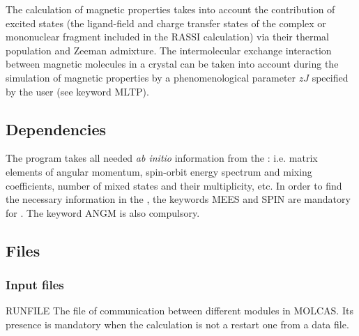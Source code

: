 
The calculation of magnetic properties takes into account the contribution of excited states (the ligand-field and charge transfer states of the complex or mononuclear fragment included in the RASSI calculation) via their thermal population and Zeeman admixture. The intermolecular exchange interaction between magnetic molecules in a crystal can be taken into account during the simulation of magnetic properties by a phenomenological parameter $zJ$ specified by the user (see keyword MLTP).

\subsection{Dependencies}
\label{UG:sec:single_aniso_dependencies}
The  program takes all needed {\it ab initio} information from the : i.e. matrix elements of angular momentum, spin-orbit energy spectrum and mixing coefficients, number of mixed states and their multiplicity, etc. In order to find the necessary information in the , the keywords MEES and SPIN are mandatory for . The  keyword ANGM is also compulsory.



\subsection{Files}
\label{UG:sec:single_aniso_files}

\subsubsection{Input files}
\begin{filelist}
\item[RUNFILE]
The file of communication between different modules in MOLCAS. Its presence is mandatory when the calculation is not a restart one from a data file.
\end{filelist}


